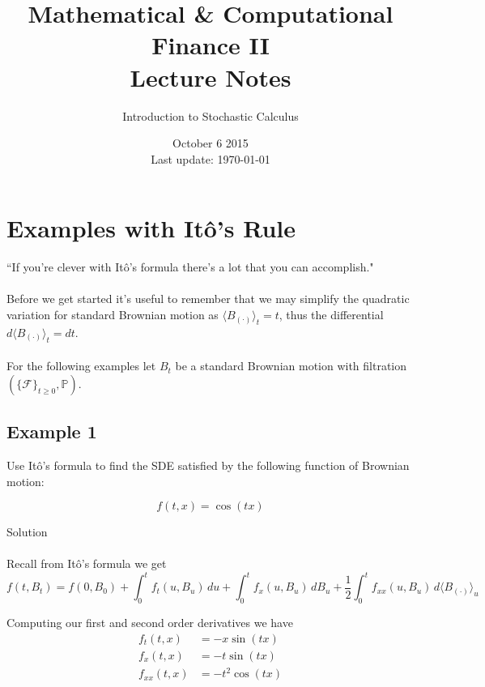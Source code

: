 \documentclass[12pt]{article}
\newlength\tindent
\renewcommand{\indent}{\hspace*{\tindent}}
\begin{document}
 
 
\title{Mathematical \& Computational Finance II\\Lecture Notes}
\author{Introduction to Stochastic Calculus}
\date{October 6 2015 \\ Last update: \today{}}
\maketitle

\section{Examples with It\^{o}'s Rule}

``If you're clever with It\^{o}'s formula there's a lot that you can accomplish." \\
\\
\indent Before we get started it's useful to remember that we may simplify the quadratic variation for standard Brownian motion as $\langle B_{(\cdot)} \rangle_t = t$, thus the differential $d\langle B_{(\cdot)} \rangle_t = dt$. \\
\\
For the following examples let $B_t$ be a standard Brownian motion with filtration $(\{\mathcal F\}_{t\geq0},\mathbb P)$. 

\subsection{Example 1}

Use It\^{o}'s formula to find the SDE satisfied by the following function of Brownian motion:

\begin{equation*}
	f(t,x) = \cos(tx)
\end{equation*}

Solution \\
\\
Recall from It\^{o}'s formula we get
\begin{equation*}
	f(t,B_t) = f(0,B_0) + \int^t_0 f_t(u,B_u)\,du + \int^t_0 f_x(u,B_u)\,dB_u + \frac{1}{2}\int^t_0 f_{xx}(u,B_u)\,d\langle B_{(\cdot)}\rangle_u
\end{equation*}

Computing our first and second order derivatives we have
\begin{align*}
	f_t(t,x) &= -x\sin(tx) \\
	f_x(t,x) &= -t\sin(tx) \\
	f_{xx}(t,x) &= -t^2\cos(tx)
\end{align*}
\end{document}
